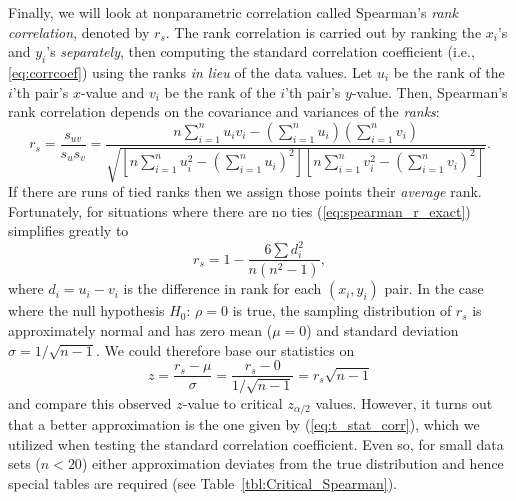 	Finally, we will look at nonparametric correlation called Spearman's \emph{rank correlation},
denoted by $r_s$.  The rank correlation is carried out by ranking the $x_i$'s and $y_i$'s 
\emph{separately}, then computing the standard correlation coefficient (i.e., \ref{eq:corrcoef}) using the ranks \emph{in lieu} of the data values. Let
$u_i$ be the rank of the $i$'th pair's $x$-value and $v_i$ be the rank of the $i$'th pair's $y$-value.  Then,
Spearman's rank correlation depends on the covariance and variances of the \emph{ranks}: 
\begin{equation}
r_s = \frac{s_{uv}}{s_u s_v} = \frac{n \sum_{i=1}^n u_i v_i - \left(\sum_{i=1}^n u_i \right)\left(\sum_{i=1}^n v_i \right)}{\sqrt{\left [n \sum_{i=1}^n u_i^2 - \left(\sum_{i=1}^n u_i \right)^2 \right] \left [n \sum_{i=1}^n v_i^2 - \left(\sum_{i=1}^n v_i \right)^2 \right]}}.
\label{eq:spearman_r_exact}
\end{equation}
If there are runs of tied ranks then we assign those points their \emph{average} rank. Fortunately, for
situations where there are no ties (\ref{eq:spearman_r_exact}) simplifies greatly to
\begin{equation}
r_s = 1 - \frac{6\sum d^2_i}{n(n^2 - 1)},
\label{eq:spearman_r}
\end{equation}
where $d_i = u_i - v_i$ is the difference in rank for each $(x_i, y_i)$ pair.
In the case where the null hypothesis $H_0$: $\rho = 0$ is true, the sampling distribution of $r_s$ is approximately normal and
has zero mean ($\mu = 0$) and standard deviation $\sigma = 1/\sqrt{n-1}$.  We could therefore base our statistics on 
\begin{equation}
z = \frac{r_s - \mu}{\sigma} = \frac{r_s - 0}{1/\sqrt{n-1}} = r _s\sqrt{n-1}
\label{eq:z_spearman}
\end{equation}
and compare this observed $z$-value to critical $z_{ \alpha / 2}$ values.
However, it turns out that a better approximation is the one given by (\ref{eq:t_stat_corr}), which we utilized when testing
the standard correlation coefficient.  Even so, for small data sets ($n < 20$) either approximation deviates
from the true distribution and hence special tables are required (see Table~\ref{tbl:Critical_Spearman}).

